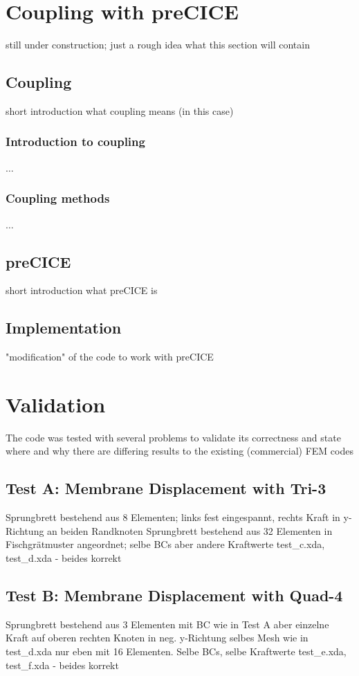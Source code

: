 \documentclass[11pt,twoside]{scrartcl}
\begin{document}
\section{Coupling with preCICE}
still under construction; just a rough idea what this section will contain
 \subsection{Coupling}
 short introduction what coupling means (in this case)
  \subsubsection{Introduction to coupling}
  $\dots$
  \subsubsection{Coupling methods}
  $\dots$
 \subsection{preCICE}
 short introduction what preCICE is
 \subsection{Implementation}
 "modification" of the code to work with preCICE
\newpage
\section{Validation}
The code was tested with several problems to validate its correctness and state where and why there are differing results to the existing (commercial) FEM codes
 \subsection{Test A: Membrane Displacement with Tri-3}
 Sprungbrett bestehend aus 8 Elementen; links fest eingespannt, rechts Kraft in y-Richtung an beiden Randknoten\newline
 Sprungbrett bestehend aus 32 Elementen in Fischgrätmuster angeordnet; selbe BCs aber andere Kraftwerte\newline
 test\_c.xda, test\_d.xda - beides korrekt
 \subsection{Test B: Membrane Displacement with Quad-4}
 Sprungbrett bestehend aus 3 Elementen mit BC wie in Test A aber einzelne Kraft auf oberen rechten Knoten in neg. y-Richtung\newline
 selbes Mesh wie in test\_d.xda nur eben mit 16 Elementen. Selbe BCs, selbe Kraftwerte\newline
 test\_e.xda, test\_f.xda - beides korrekt
\end{document}
